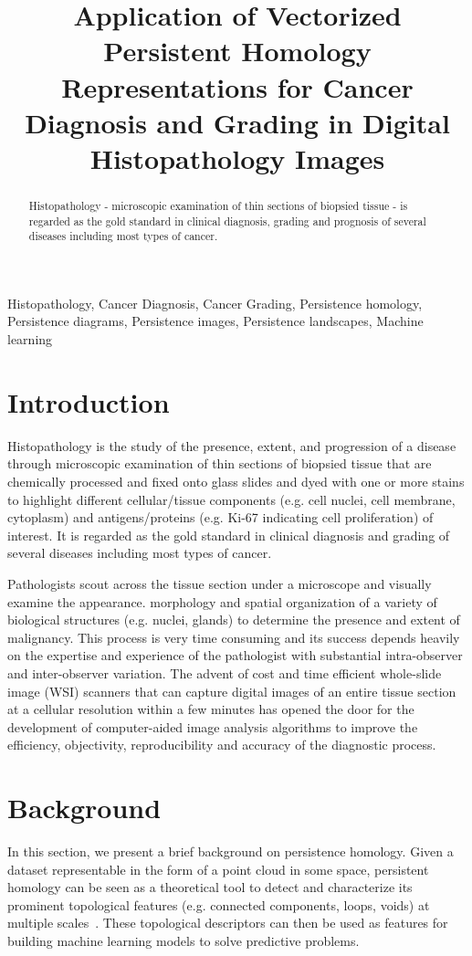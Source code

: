 \documentclass{article}
\title{Application of Vectorized Persistent Homology Representations for 
Cancer Diagnosis and Grading in Digital Histopathology Images}
\begin{document}
%
\maketitle
%
\begin{abstract}
Histopathology - microscopic examination of thin sections of biopsied tissue - is regarded as the gold standard in clinical diagnosis, grading and prognosis of several diseases including most types of cancer.

\end{abstract}
%
\begin{keywords}
Histopathology, Cancer Diagnosis, Cancer Grading, Persistence homology, Persistence diagrams, Persistence images, Persistence landscapes, Machine learning
\end{keywords}
%
\section{Introduction}
\label{sec:intro}
Histopathology is the study of the presence, extent, and progression of a disease through microscopic examination of thin sections of biopsied tissue that are chemically processed and fixed onto glass slides and dyed with one or more stains to highlight different cellular/tissue components (e.g. cell nuclei, cell membrane, cytoplasm) and antigens/proteins (e.g. Ki-67 indicating cell proliferation) of interest. It is regarded as the gold standard in clinical diagnosis and grading of several diseases including most types of cancer. 

Pathologists scout across the tissue section under a microscope and visually examine the appearance. morphology and spatial organization of a variety of biological structures (e.g. nuclei, glands) to determine the presence and extent of malignancy. This process is very time consuming and its success depends heavily on the expertise and experience of the pathologist with substantial intra-observer and inter-observer variation. The advent of cost and time efficient whole-slide image (WSI) scanners that can capture digital images of an entire tissue section at a cellular resolution within a few minutes has opened the door for the development of computer-aided image analysis algorithms to improve the efficiency, objectivity, reproducibility and accuracy of the diagnostic process.

\section{Background}
\label{sec:background}
In this section, we present a brief background on persistence homology. Given a dataset representable in the form of a point cloud in some space, persistent homology can be seen as a theoretical tool to detect and characterize its prominent topological features (e.g. connected components, loops, voids) at multiple scales~\cite{Zhu2013}. These topological descriptors can then be used as features for building machine learning models to solve predictive problems. 
\end{document}
